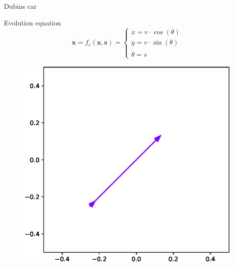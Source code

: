 \documentclass[10pt, xcolor={usenames, dvipsnames}]{beamer}
\begin{document}
        \begin{frame}{Dubins car}
            \centering
            \begin{minipage}{.6\textwidth}
                \begin{block}{Evolution equation}
                    \vspace*{2.5mm}
                    \begin{equation}
                        \dot{\mathbf{x}} = f_r(\mathbf{x}, \mathbf{s}) = 
                        \begin{cases*}
                            \dot{x} = v \cdot \cos(\theta) \\
                            \dot{y} = v \cdot \sin(\theta) \\
                            \dot{\theta} = s
                        \end{cases*}
                    \end{equation}
                \end{block}
            \end{minipage}
            \hfill
            \begin{minipage}{.38\textwidth}
                \begin{figure}
                    \begin{overprint}
                        \includegraphics[width=\textwidth]{imgs/dubins_straight}

\end{overprint}
\end{figure}
\end{minipage}
\end{frame}
\end{document}
